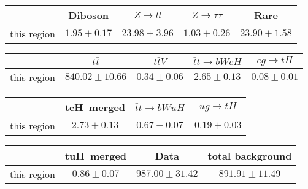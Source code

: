 \centering
\begin{tabular}{|c|c|c|c|c|} \hline
 & Diboson & $Z\to ll$ & $Z\to \tau\tau$ & Rare\\\hline
this region & $1.95\pm0.17$ & $23.98\pm3.96$ & $1.03\pm0.26$ & $23.90\pm1.58$\\\hline
\end{tabular}
\begin{tabular}{|c|c|c|c|c|} \hline
 & $t\bar{t}$ & $t\bar{t}V$ & $\bar{t}t\to bWcH$ & $cg\to tH$\\\hline
this region & $840.02\pm10.66$ & $0.34\pm0.06$ & $2.65\pm0.13$ & $0.08\pm0.01$\\\hline
\end{tabular}
\begin{tabular}{|c|c|c|c|} \hline
 & tcH~merged & $\bar{t}t\to bWuH$ & $ug\to tH$\\\hline
this region & $2.73\pm0.13$ & $0.67\pm0.07$ & $0.19\pm0.03$\\\hline
\end{tabular}
\begin{tabular}{|c|c|c|c|} \hline
 & tuH~merged & Data & total background\\\hline
this region & $0.86\pm0.07$ & $987.00\pm31.42$ & $891.91\pm11.49$\\\hline
\end{tabular}
